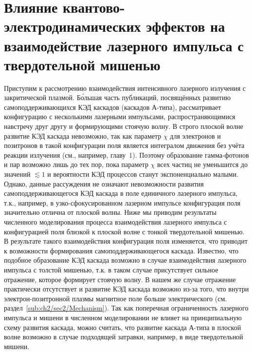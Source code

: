 \section{Влияние квантово-электродинамических эффектов на взаимодействие лазерного импульса с твердотельной мишенью}
\label{sec:ch2/sec2}

Приступим к рассмотрению взаимодействия интенсивного лазерного излучения с закритической плазмой. 
Б\'{о}льшая часть публикаций, посвящённых развитию самоподдерживающихся КЭД каскадов (каскадов А-типа), рассматривает конфигурацию с несколькими лазерными импульсами, распространяющимися навстречу друг другу и формирующими стоячую волну.
В строго плоской волне развитие КЭД каскада невозможно, так как параметр $\chi$ для электронов и позитронов в такой конфигурации поля является интегралом движения без учёта реакции излучения (см., например, главу~1).
Поэтому образование гамма-фотонов и пар возможно лишь до тех пор, пока параметр $\chi$ всех частиц не уменьшится до значений $\lesssim 1$ и вероятности КЭД процессов станут экспоненциально малыми.
Однако, данные рассуждения не означают невозможности развития самоподдерживающегося КЭД каскада в поле единичного лазерного импульса, т.к., например, в узко-сфокусированном лазерном импульсе конфигурация поля значительно отлична от плоской волны.
Ниже мы приводим результаты численного моделирования процесса взаимодействия лазерного импульса с конфигурацией поля близкой к плоской волне с тонкой твердотельной мишенью.
В результате такого взаимодействия конфигурация поля изменяется, что приводит к возможности формирования самоподдерживающегося каскада.
Известно, что подобное образование КЭД каскада возможно в случае взаимодействия лазерного импульса с толстой мишенью, т.к. в таком случае присутствует сильное отражение, которое формирует стоячую волну.
В нашем же случае отражение практически отсутствует и развитие КЭД каскада возможно из-за того, что внутри электрон-позитронной плазмы магнитное поле больше электрического (см. раздел~\ref{sub:ch2/sec2/Mechanism}).
Так как поперечная ограниченность лазерного импульса и мишени в численном моделировании не влияет на принципиальную схему развития каскада, можно считать, что развитие каскада А-типа в плоской волне возможно в случае подходящей затравки, например, в виде твердотельной мишени.

